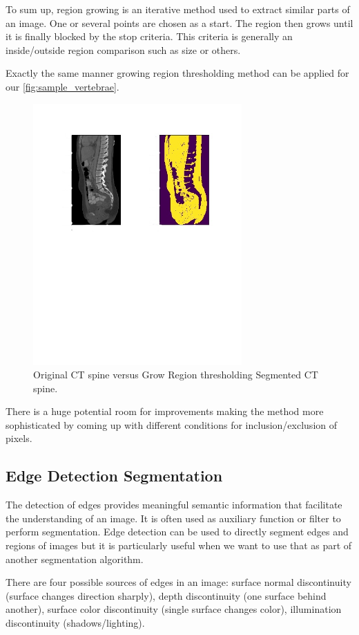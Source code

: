 To sum up, region growing is an iterative method used to extract similar parts of an image. One or several points are chosen as a start. The region then grows until it is finally blocked by the stop criteria. This criteria is generally an inside/outside region comparison such as size or others. 

Exactly the same manner growing region thresholding method can be applied for our \ref{fig:sample_vertebrae}.
\begin{figure}[h]
    \centering \includegraphics[width=8cm]{images/ct-spine-grow-region-segmented.jpg}
    \vspace*{-50mm} \caption {Original CT spine versus Grow Region thresholding Segmented CT spine.}
\end{figure}    

There is a huge potential room for improvements making the method more sophisticated by coming up with different conditions for inclusion/exclusion of pixels.

\subsection{Edge Detection Segmentation}
The detection of edges provides meaningful semantic information that facilitate the understanding of an image. It is often used as auxiliary function or filter to perform segmentation. Edge detection can be used to directly segment edges and regions of images but it is particularly useful when we want to use that as part of another segmentation algorithm.

There are four possible sources of edges in an image: surface normal discontinuity (surface changes direction sharply), depth discontinuity (one surface behind another), surface color discontinuity (single surface changes color), illumination discontinuity (shadows/lighting).

